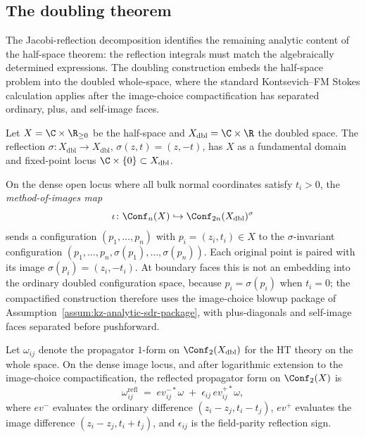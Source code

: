 \subsection{The doubling theorem}

The Jacobi-reflection decomposition identifies the remaining analytic
content of the half-space theorem: the reflection integrals must match
the algebraically determined expressions. The doubling construction
embeds the half-space problem into the doubled whole-space, where the
standard Kontsevich--FM Stokes calculation applies after the
image-choice compactification has separated ordinary, plus, and
self-image faces.

\begin{construction}
\label{cons:doubled-configuration}
Let $X=\C\times\R_{\ge 0}$ be the half-space and
$X_{\mathrm{dbl}}=\C\times\R$ the doubled space. The reflection
$\sigma\colon X_{\mathrm{dbl}}\to X_{\mathrm{dbl}}$,
$\sigma(z,t)=(z,-t)$, has $X$ as a fundamental domain and
fixed-point locus $\C\times\{0\}\subset X_{\mathrm{dbl}}$.

On the dense open locus where all bulk normal coordinates satisfy
$t_i>0$, the \emph{method-of-images map}
\[
\iota\colon\Conf_n(X)
\hookrightarrow
\Conf_{2n}(X_{\mathrm{dbl}})^{\sigma}
\]
sends a configuration $(p_1,\ldots,p_n)$ with $p_i=(z_i,t_i)\in X$ to
the $\sigma$-invariant configuration
$(p_1,\ldots,p_n,\sigma(p_1),\ldots,\sigma(p_n))$. Each original
point is paired with its image $\sigma(p_i)=(z_i,-t_i)$. At boundary
faces this is not an embedding into the ordinary doubled configuration
space, because $p_i=\sigma(p_i)$ when $t_i=0$; the compactified
construction therefore uses the image-choice blowup package of
Assumption~\ref{assum:kz-analytic-sdr-package}, with plus-diagonals and
self-image faces separated before pushforward.
\end{construction}

\begin{proposition}
\label{prop:reflected-pullback}
Let $\omega_{ij}$ denote the propagator $1$-form on
$\Conf_2(X_{\mathrm{dbl}})$ for the HT theory on the
whole space. On the dense image locus, and after logarithmic extension
to the image-choice compactification, the reflected propagator form on
$\Conf_2(X)$ is
\begin{equation}\label{eq:refl-as-pullback}
\omega_{ij}^{\mathrm{refl}}
\;=\;
ev_{ij}^{-*}\omega
\;+\;
\epsilon_{ij}\,ev_{ij}^{+*}\omega,
\end{equation}
where $ev^{-}$ evaluates the ordinary difference
$(z_i-z_j,t_i-t_j)$, $ev^{+}$ evaluates the image difference
$(z_i-z_j,t_i+t_j)$, and $\epsilon_{ij}$ is the field-parity
reflection sign.
\end{proposition}

